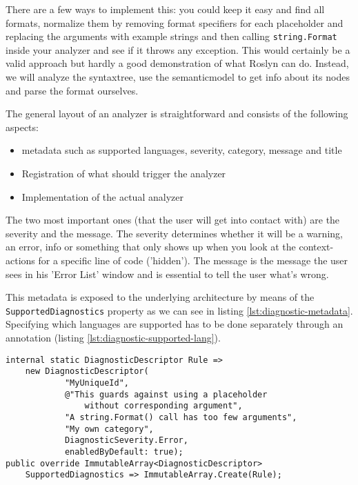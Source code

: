 There are a few ways to implement this: you could keep it easy and find all formats, normalize them by removing format specifiers for each placeholder and replacing the arguments with example strings and then calling \texttt{string.Format} inside your analyzer and see if it throws any exception. This would certainly be a valid approach but hardly a good demonstration of what Roslyn can do. Instead, we will analyze the \gls{syntaxtree}, use the \gls{semanticmodel} to get info about its nodes and parse the format ourselves.

The general layout of an analyzer is straightforward and consists of the following aspects:

\begin{itemize}
\item \Gls{metadata} such as supported languages, severity, category, message and title
\item Registration of what should trigger the analyzer
\item Implementation of the actual analyzer
\end{itemize}

The two most important ones (that the user will get into contact with) are the severity and the message. The severity determines whether it will be a warning, an error, info or something that only shows up when you look at the context-actions for a specific line of code ('hidden'). The message is the message the user sees in his 'Error List' window and is essential to tell the user what's wrong.

This \gls{metadata} is exposed to the underlying architecture by means of the \\ \texttt{SupportedDiagnostics} property as we can see in listing \ref{lst:diagnostic-metadata}. Specifying which languages are supported has to be done separately through an annotation (listing \ref{lst:diagnostic-supported-lang}).

\begin{lstlisting}[label={lst:diagnostic-metadata}]
internal static DiagnosticDescriptor Rule =>
	new DiagnosticDescriptor(
			"MyUniqueId", 
			@"This guards against using a placeholder 
				without corresponding argument", 
			"A string.Format() call has too few arguments", 
			"My own category", 
			DiagnosticSeverity.Error, 
			enabledByDefault: true);
public override ImmutableArray<DiagnosticDescriptor> 
	SupportedDiagnostics => ImmutableArray.Create(Rule);							
\end{lstlisting}

